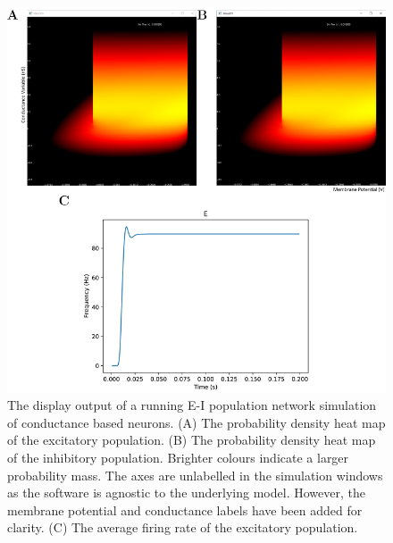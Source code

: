 \documentclass[utf8]{frontiersSCNS} %
\begin{document}
\begin{figure}[htb!]
  \centering
  \includegraphics[width=\linewidth]{images/cond_full_figure.pdf}
  \caption{The display output of a running E-I population network simulation of conductance based neurons. (A) The probability density heat map of the excitatory population. (B) The probability density heat map of the inhibitory population. Brighter colours indicate a larger probability mass. The axes are unlabelled in the simulation windows as the software is agnostic to the underlying model. However, the membrane potential and conductance labels have been added for clarity. (C) The average firing rate of the excitatory population.}
  \label{fig:quickstart}
\end{figure}
\end{document}

